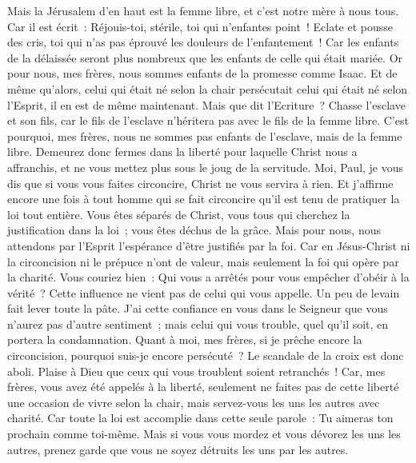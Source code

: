 \begin{multicols}{2}
Mais la Jérusalem d'en haut est la femme libre, et c'est notre mère à nous tous.
Car il est écrit~: Réjouis-toi, stérile, toi qui n'enfantes point~! Eclate et pousse des cris, toi qui n'as pas éprouvé les douleurs de l'enfantement~! Car les enfants de la délaissée seront plus nombreux que les enfants de celle qui était mariée.
Or pour nous, mes frères, nous sommes enfants de la promesse comme Isaac.
Et de même qu'alors, celui qui était né selon la chair persécutait celui qui était né selon l'Esprit, il en est de même maintenant.
Mais que dit l'Ecriture~? Chasse l'esclave et son fils, car le fils de l'esclave n'héritera pas avec le fils de la femme libre.
C'est pourquoi, mes frères, nous ne sommes pas enfants de l'esclave, mais de la femme libre.
\VerseOne{}Demeurez donc fermes dans la liberté pour laquelle Christ nous a affranchis, et ne vous mettez plus sous le joug de la servitude.
Moi, Paul, je vous dis que si vous vous faites circoncire, Christ ne vous servira à rien.
Et j'affirme encore une fois à tout homme qui se fait circoncire qu'il est tenu de pratiquer la loi tout entière.
Vous êtes séparés de Christ, vous tous qui cherchez la justification dans la loi~; vous êtes déchus de la grâce.
Mais pour nous, nous attendons par l'Esprit l'espérance d'être justifiés par la foi.
Car en Jésus-Christ ni la circoncision ni le prépuce n'ont de valeur, mais seulement la foi qui opère par la charité.
Vous couriez bien~: Qui vous a arrêtés pour vous empêcher d'obéir à la vérité~?
Cette influence ne vient pas de celui qui vous appelle.
Un peu de levain fait lever toute la pâte.
J'ai cette confiance en vous dans le Seigneur que vous n'aurez pas d'autre sentiment~; mais celui qui vous trouble, quel qu'il soit, en portera la condamnation.
Quant à moi, mes frères, si je prêche encore la circoncision, pourquoi suis-je encore persécuté~? Le scandale de la croix est donc aboli.
Plaise à Dieu que ceux qui vous troublent soient retranchés~!
Car, mes frères, vous avez été appelés à la liberté, seulement ne faites pas de cette liberté une occasion de vivre selon la chair, mais servez-vous les uns les autres avec charité.
Car toute la loi est accomplie dans cette seule parole~: Tu aimeras ton prochain comme toi-même.
Mais si vous vous mordez et vous dévorez les uns les autres, prenez garde que vous ne soyez détruits les uns par les autres.

\end{multicols}
